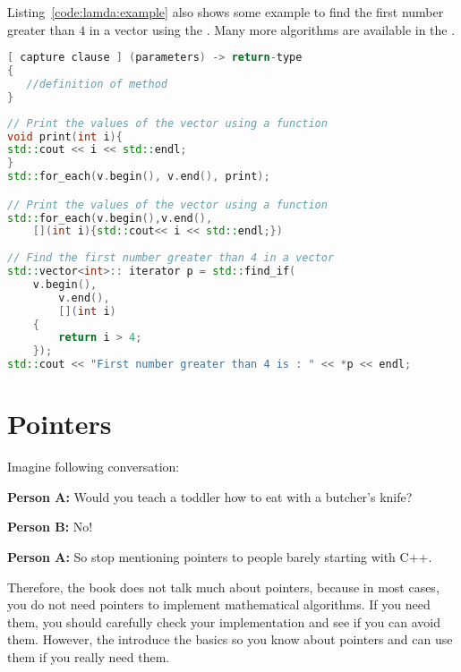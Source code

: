 Listing~\ref{code:lamda:example} also shows some example to find the first number greater than $4$ in a vector using the . Many more algorithms are available in the .

\begin{lstlisting}[language=c++,caption={Example for lambda functions.
\label{code:lamda:definition}},float,floatplacement=tb]
[ capture clause ] (parameters) -> return-type  
{   
   //definition of method   
} 
\end{lstlisting}


\begin{lstlisting}[language=c++,caption={Practical example for a lambda function.
\label{code:lamda:example}},float,floatplacement=tb]
// Print the values of the vector using a function
void print(int i){
std::cout << i << std::endl;
}
std::for_each(v.begin(), v.end(), print); 

// Print the values of the vector using a function
std::for_each(v.begin(),v.end(),
	[](int i){std::cout<< i << std::endl;})
	
// Find the first number greater than 4 in a vector
std::vector<int>:: iterator p = std::find_if(
    v.begin(), 
    	v.end(), 
    	[](int i) 
    { 
        return i > 4; 
    }); 
std::cout << "First number greater than 4 is : " << *p << endl;
\end{lstlisting}

\section{Pointers}
Imagine following conversation:
\begin{flushleft}
\textbf{Person A:} Would you teach a toddler how to eat with a butcher's knife?
\end{flushleft}
\begin{flushright}
\textbf{Person B:} No!
\end{flushright}
\begin{flushleft}
\textbf{Person A:} So stop mentioning pointers to people barely
starting with C++.
\end{flushleft}
Therefore, the book does not talk much about pointers, because in most cases, you do not need pointers to implement mathematical algorithms. If you need them, you should carefully check your implementation and see if you can avoid them. However, the introduce the basics so you know about pointers and can use them if you really need them.\\

